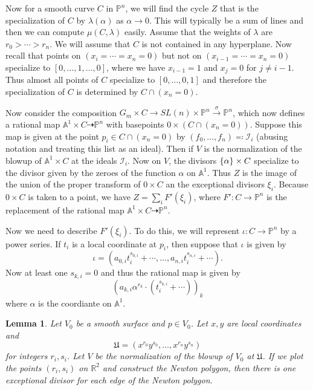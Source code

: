 \documentclass[leqno, openany]{memoir}
\newtheorem{lem}[thm]{Lemma}
\theoremstyle{definition}
\theoremstyle{remark}
\theoremstyle{plain}
\theoremstyle{definition}
\theoremstyle{remark}
\newcommand{\A}{\mathbb{A}}
\newcommand{\R}{\mathbb{R}}
\renewcommand{\P}{\mathbb{P}}
\newcommand{\mc}[1]{\mathcal{#1}}
\newcommand{\mf}[1]{\mathfrak{#1}}
\begin{document}
Now for a smooth curve $C$ in $\P^n$, we will find the cycle $Z$ that is the
specialization of $C$ by $\lambda(\alpha)$ as $\alpha \to 0$. This will
typically be a sum of lines and then we can compute $\mu(C, \lambda)$ easily.
Assume that the weights of $\lambda$ are $r_0 > \cdots > r_n$. We will assume
that $C$ is not contained in any hyperplane. Now recall that points on $(x_i =
\cdots = x_n = 0)$ but not on $(x_{i-1} = \cdots = x_{n}=0)$ specialize to $[0,
\ldots, 1, \ldots, 0]$, where we have $x_{i-1} = 1$ and $x_j = 0$ for $j \neq
i-1$. Thus almost all points of $C$ specialize to $[0, \ldots, 0, 1]$ and
therefore the specialization of $C$ is determined by $C \cap (x_n = 0)$.

Now consider the composition $G_m \times C \to SL(n) \times \P^n
\xrightarrow{\sigma} \P^n$, which now defines a rational map $\A^1 \times C
\dashrightarrow \P^n$ with basepoints $\qty{0} \times (C \cap (x_n = 0))$.
Suppose this map is given at the point $p_i \in C \cap (x_n = 0)$ by $(f_0,
\ldots, f_n) \eqqcolon \mc{I}_i$ (abusing notation and treating this list as an
ideal). Then if $V$ is the normalization of the blowup of $\A^1 \times C$ at
the ideals $\mc{I}_i$. Now on $V$, the divisors $\qty{\alpha} \times C$
specialize to the divisor given by the zeroes of the function $\alpha$ on
$\A^1$. Thus $Z$ is the image of the union of the proper transform of  $\qty{0}
\times C$ an the exceptional divisors $\xi_i$. Because $0 \times C$ is taken to
a point, we have $Z = \sum_i F'(\xi_i)$, where $F' \colon C \to \P^n$ is the
replacement of the rational map $\A^1 \times C \dashrightarrow \P^n$.

Now we need to describe $F'(\xi_i)$. To do this, we will represent $\iota
\colon C \to \P^n$ by a power series. If $t_i$ is a local coordinate at $p_i$,
then suppose that $\iota$ is given by \[ \iota = (a_{0,i} t_i^{s_{0,i}} +
\cdots, \ldots, a_{n,i} t_i^{s_{n,i}} + \cdots). \] Now at least one $s_{k,i} =
0$ and thus the rational map is given by \[ (a_{k,i} \alpha^{r_k} \cdot
(t_i^{s_{k,i}} + \cdots) )_k \] where $\alpha$ is the coordiante on $\A^1$.

\begin{lem} Let $V_0$ be a smooth surface and $p \in V_0$. Let $x,y$ are local
    coordinates and \[ \mf{U} = (x^{r_0} y^{s_0}, \ldots, x^{r_n} y^{s_n}) \]
    for integers $r_i, s_i$. Let $V$ be the normalization of the blowup of
    $V_0$ at $\mf{U}$. If we plot the points $(r_i, s_{i})$ on $\R^2$ and
    construct the Newton polygon, then there is one exceptional divisor for
    each edge of the Newton polygon.  \end{lem}
\end{document}
